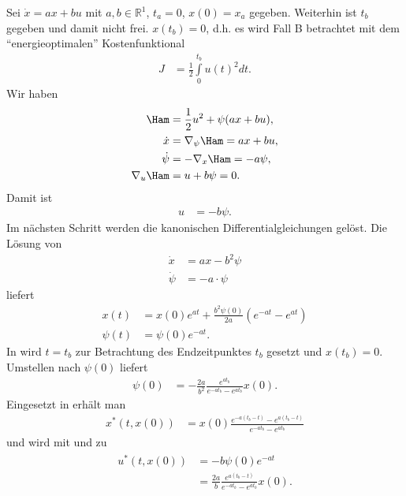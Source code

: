 \begin{exmp}\label{exmp:kap_2_vor_optlsg_1}
Sei $\dot{x}=ax+bu$ mit $a,b\in\mathbb{R}^1$, $t_a=0$, $x(0)=x_a$ gegeben. Weiterhin ist $t_b$ gegeben und damit nicht frei. $x(t_b)=0$, d.h. es
wird Fall B betrachtet mit dem "`energieoptimalen"' Kostenfunktional 
\begin{align*}
	J & = \frac12\int\limits_0^{t_b}u(t)^2dt.
\end{align*}
Wir haben
\begin{align*}
	\Ham & = \frac12 u^2 + \psi(ax+bu),\\
	\dot{x} & = \nabla_{\psi}\Ham = ax+bu,\\
	\dot{\psi} & = -\nabla_x\Ham = -a \psi,\\
	\nabla_u\Ham & = u+b\psi = 0.
\end{align*}
Damit ist 
\begin{align}
	u & = -b\psi.	\label{eqn:kap_2_vor_optlsg_u}
\end{align}
Im nächsten Schritt werden die kanonischen Differentialgleichungen gelöst. Die Lösung von 
\begin{align*}
	\dot{x} & = ax - b^2\psi\\
	\dot{\psi} & = -a\cdot\psi
\end{align*}
liefert
\begin{align}
	x(t) & = x(0)e^{at}+\frac{b^2\psi(0)}{2a}\left(e^{-at}-e^{at} \right)	\label{eqn:kap_2_vor_optlsg_x}\\
	\psi(t) & = \psi(0)e^{-at}.		\label{eqn:kap_2_vor_optlsg_psi}
\end{align}
In  wird $t=t_b$ zur Betrachtung des Endzeitpunktes $t_b$ gesetzt und $x(t_b)= 0$. Umstellen nach $\psi(0)$ liefert
\begin{align}
	\psi(0) & = -\frac{2a}{b^2}\frac{e^{at_b}}{e^{-at_b}-e^{at_b}}x(0).	\label{eqn:kap_2_vor_optlsg_psi0}
\end{align}
Eingesetzt in  erhält man
\begin{align}
	x^{\ast}(t,x(0)) & = x(0)\frac{e^{-a(t_b-t)}-e^{a(t_b-t)}}{e^{-at_b}-e^{at_b}}	\label{eqn:kap_2_vor_optlsg_xast}
\end{align}
und  wird mit  und  zu
\begin{align}
\begin{split}\label{eqn:kap_2_vor_optlsg_uast}
	u^{\ast}(t,x(0)) & = -b\psi(0)e^{-at}\\
	& = \frac{2a}{b}\frac{e^{a(t_b-t)}}{e^{-at_b}-e^{at_b}} x(0).

\end{split}
\end{align}
\end{exmp}
